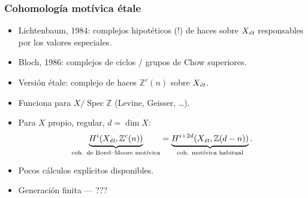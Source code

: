 \documentclass[handout]{beamer}
\newcommand{\ZZ}{\mathbb{Z}}
\DeclareMathOperator{\Spec}{Spec}
\newcommand{\et}{\text{\it ét}}
\begin{document}

\begin{frame}
  \frametitle{Cohomología motívica étale}

  \begin{itemize}
  \item<2-> Lichtenbaum, 1984: complejos hipotéticos (!) de haces sobre $X_\et$
    responsables por los valores especiales.

  \item<3-> Bloch, 1986: complejos de ciclos / grupos de Chow superiores.

  \item<4-> Versión étale: complejo de haces $\ZZ^c (n)$ sobre $X_\et$.

  \item<5-> Funciona para $X / \Spec \ZZ$ (Levine, Geisser, \ldots).

  \item<6-> Para $X$ propio, regular, $d = \dim X$:
    \[ \underbrace{H^i (X_\et, \ZZ^c (n))}_{\text{coh. de Borel--Moore motívica}} = \underbrace{H^{i+2d} (X_\et, \ZZ (d-n))}_{\text{coh. motívica habitual}}. \]

  \item<7-> Pocos cálculos explícitos disponibles.

  \item<8-> Generación finita --- ???
  \end{itemize}
\end{frame}

\end{document}
